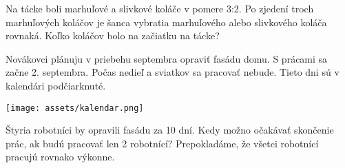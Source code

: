 \begin{example}
	Na tácke boli marhuľové a slivkové koláče v pomere 3:2. Po zjedení troch marhuľových koláčov je šanca vybratia marhuľového alebo slivkového koláča rovnaká. Koľko koláčov bolo na začiatku na tácke?
\end{example}

\begin{example}
	Novákovci plánuju v priebehu septembra opraviť fasádu domu. S prácami sa začne 2. septembra. Počas nedieľ a sviatkov sa pracovať nebude. Tieto dni sú v kalendári podčiarknuté. 
	
	\begin{center}
		\texttt{[image: assets/kalendar.png]}
	\end{center}
	Štyria robotníci by opravili fasádu za 10 dní. Kedy možno očakávať skončenie prác, ak budú pracovať len 2 robotnící? Prepokladáme, že všetci robotnící pracujú rovnako výkonne. 
\end{example}
